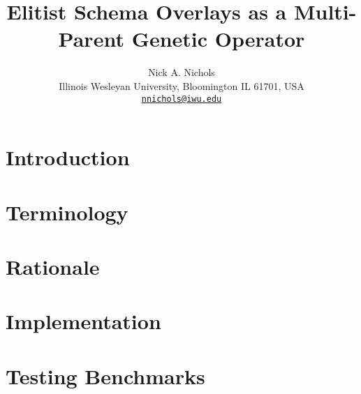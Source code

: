 \documentclass{article}
\makeatletter
\def \papertitle {Elitist Schema Overlays as a Multi-Parent Genetic Operator}
\def \paperauthors {Nick A. Nichols}
\def \paperinstitute {\small Illinois Wesleyan University, Bloomington IL 61701, USA}
\def \paperemails {\small\href{mailto:nnichols@iwu.edu}{\nolinkurl{nnichols@iwu.edu}}}
\makeatother
\begin{document}
\title{\papertitle}
\author{\paperauthors \\ \paperinstitute \\ \paperemails}

\maketitle


\begin{abstract}

\end{abstract}








\section{Introduction} 
\label{sec:introduction}



\section{Terminology} 
\label{sec:terminology}



\section{Rationale}
\label{sec:rationale}



\section{Implementation}
\label{sec:implementation}



\section{Testing Benchmarks}
\label{sec:testfunctions}

\end{document}
